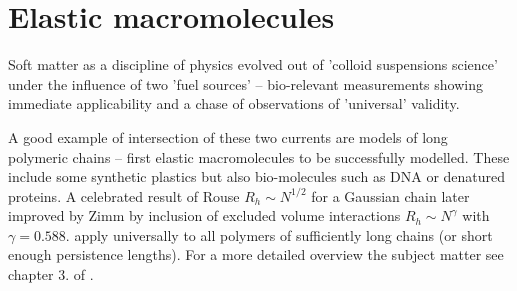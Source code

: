\documentclass{doctoral}
\begin{document}
\section{Elastic macromolecules}

Soft matter as a discipline of physics evolved out of 'colloid suspensions science' under the influence of two 'fuel sources' -- bio-relevant measurements showing immediate applicability and a chase of observations of 'universal' validity.

A good example of intersection of these two currents are models of long polymeric chains -- first elastic macromolecules to be successfully modelled.
These include some synthetic plastics but also bio-molecules such as DNA or denatured proteins.
A celebrated result of Rouse $R_h \sim N^{1/2}$ for a Gaussian chain\cite{Rouse_1953} later improved by Zimm by inclusion of excluded volume interactions \cite{Zimm_1956} $R_h \sim N^\gamma$ with $\gamma=0.588$.
apply universally to all polymers of sufficiently long chains (or short enough persistence lengths).
For a more detailed overview the subject matter see chapter 3.
of \textcite{Dhont_2008}.




\end{document}
